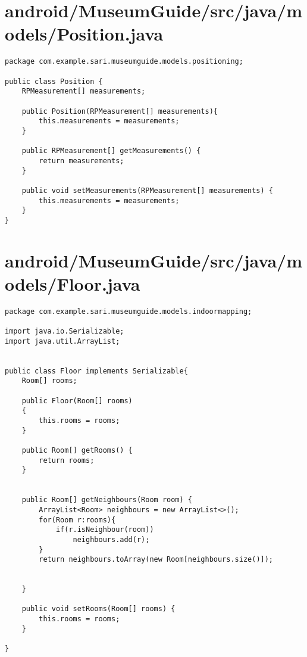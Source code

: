 \section{android/MuseumGuide/src/java/models/Position.java}
\begin{lstlisting}package com.example.sari.museumguide.models.positioning;

public class Position {
    RPMeasurement[] measurements;

    public Position(RPMeasurement[] measurements){
        this.measurements = measurements;
    }

    public RPMeasurement[] getMeasurements() {
        return measurements;
    }

    public void setMeasurements(RPMeasurement[] measurements) {
        this.measurements = measurements;
    }
}
\end{lstlisting}
\newpage
\section{android/MuseumGuide/src/java/models/Floor.java}
\begin{lstlisting}package com.example.sari.museumguide.models.indoormapping;

import java.io.Serializable;
import java.util.ArrayList;


public class Floor implements Serializable{
    Room[] rooms;

    public Floor(Room[] rooms)
    {
        this.rooms = rooms;
    }

    public Room[] getRooms() {
        return rooms;
    }


    public Room[] getNeighbours(Room room) {
        ArrayList<Room> neighbours = new ArrayList<>();
        for(Room r:rooms){
            if(r.isNeighbour(room))
                neighbours.add(r);
        }
        return neighbours.toArray(new Room[neighbours.size()]);


    }

    public void setRooms(Room[] rooms) {
        this.rooms = rooms;
    }

}
\end{lstlisting}
\newpage
